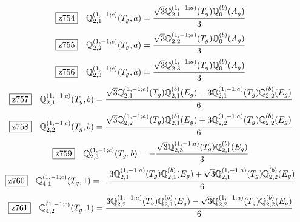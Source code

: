 \documentclass[fleqn,10pt,landscape]{jsarticle}
\begin{document}
\begin{dmath*}
\hspace*{3mm}\fbox{z754}\quad \mathbb{Q}_{2,1}^{(1,-1;c)}(T_{g},a)=\frac{\sqrt{3} \mathbb{Q}_{2,1}^{(1,-1;a)}(T_{g}) \mathbb{Q}_{0}^{(b)}(A_{g})}{3}
\end{dmath*}
\begin{dmath*}
\hspace*{3mm}\fbox{z755}\quad \mathbb{Q}_{2,2}^{(1,-1;c)}(T_{g},a)=\frac{\sqrt{3} \mathbb{Q}_{2,2}^{(1,-1;a)}(T_{g}) \mathbb{Q}_{0}^{(b)}(A_{g})}{3}
\end{dmath*}
\begin{dmath*}
\hspace*{3mm}\fbox{z756}\quad \mathbb{Q}_{2,3}^{(1,-1;c)}(T_{g},a)=\frac{\sqrt{3} \mathbb{Q}_{2,3}^{(1,-1;a)}(T_{g}) \mathbb{Q}_{0}^{(b)}(A_{g})}{3}
\end{dmath*}
\begin{dmath*}
\hspace*{3mm}\fbox{z757}\quad \mathbb{Q}_{2,1}^{(1,-1;c)}(T_{g},b)=\frac{\sqrt{3} \mathbb{Q}_{2,1}^{(1,-1;a)}(T_{g}) \mathbb{Q}_{2,1}^{(b)}(E_{g}) - 3 \mathbb{Q}_{2,1}^{(1,-1;a)}(T_{g}) \mathbb{Q}_{2,2}^{(b)}(E_{g})}{6}
\end{dmath*}
\begin{dmath*}
\hspace*{3mm}\fbox{z758}\quad \mathbb{Q}_{2,2}^{(1,-1;c)}(T_{g},b)=\frac{\sqrt{3} \mathbb{Q}_{2,2}^{(1,-1;a)}(T_{g}) \mathbb{Q}_{2,1}^{(b)}(E_{g}) + 3 \mathbb{Q}_{2,2}^{(1,-1;a)}(T_{g}) \mathbb{Q}_{2,2}^{(b)}(E_{g})}{6}
\end{dmath*}
\begin{dmath*}
\hspace*{3mm}\fbox{z759}\quad \mathbb{Q}_{2,3}^{(1,-1;c)}(T_{g},b)=- \frac{\sqrt{3} \mathbb{Q}_{2,3}^{(1,-1;a)}(T_{g}) \mathbb{Q}_{2,1}^{(b)}(E_{g})}{3}
\end{dmath*}
\begin{dmath*}
\hspace*{3mm}\fbox{z760}\quad \mathbb{Q}_{4,1}^{(1,-1;c)}(T_{g},1)=- \frac{3 \mathbb{Q}_{2,1}^{(1,-1;a)}(T_{g}) \mathbb{Q}_{2,1}^{(b)}(E_{g}) + \sqrt{3} \mathbb{Q}_{2,1}^{(1,-1;a)}(T_{g}) \mathbb{Q}_{2,2}^{(b)}(E_{g})}{6}
\end{dmath*}
\begin{dmath*}
\hspace*{3mm}\fbox{z761}\quad \mathbb{Q}_{4,2}^{(1,-1;c)}(T_{g},1)=\frac{3 \mathbb{Q}_{2,2}^{(1,-1;a)}(T_{g}) \mathbb{Q}_{2,1}^{(b)}(E_{g}) - \sqrt{3} \mathbb{Q}_{2,2}^{(1,-1;a)}(T_{g}) \mathbb{Q}_{2,2}^{(b)}(E_{g})}{6}
\end{dmath*}
\end{document}

